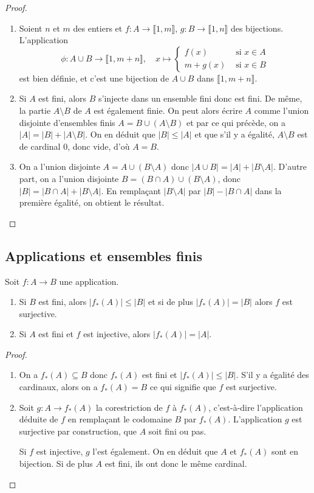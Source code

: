 \begin{proof}
\begin{enumerate}
\item Soient $n$ et $m$ des entiers et $f : A\to \llbracket 1,m\rrbracket$, $g : B\to \llbracket 1,n\rrbracket$ des bijections. L'application 
\[
\phi : A\cup B \to \llbracket 1,m+n\rrbracket, \quad x\mapsto
\begin{cases}
f(x) & \text{ si }x\in A\\
m+g(x) & \text{ si }x\in B
\end{cases}
\]
est bien définie, et c'est une bijection de $A\cup B$ dans $\llbracket 1,m+n\rrbracket$.
\item Si $A$ est fini, alors $B$ s'injecte dans un ensemble fini donc est fini. De même, la partie $A\setminus B$ de $A$ est également finie. On peut alors écrire $A$ comme l'union disjointe d'ensembles finis $A=B \cup (A\setminus B)$ et par ce qui précède, on a $|A|=|B|+|A\setminus B|$. On en déduit que $|B|\leq |A|$ et que s'il y a égalité, $A\setminus B$ est de cardinal $0$, donc vide, d'où $A=B$.
\item On a l'union disjointe $A = A\cup (B\setminus A)$  donc $|A\cup B| = |A|+|B\setminus A|$.
D'autre part, on a l'union disjointe $B = (B\cap A) \cup (B\setminus A)$, donc $|B| = |B\cap A|+|B\setminus A|$.
En remplaçant $|B\setminus A|$ par $|B|-|B\cap A|$ dans la première égalité, on obtient le résultat.
\end{enumerate}
\end{proof}

\subsection{Applications et ensembles finis}

\begin{proposition}
Soit $f : A\to B$ une application.
\begin{enumerate}
\item Si $B$ est fini, alors $|f_*(A)|\leq |B|$ et si de plus $|f_*(A)|= |B|$ alors $f$ est surjective.
\item Si $A$ est fini et $f$ est injective, alors $|f_*(A)|=|A|$.
\end{enumerate}
\end{proposition}
\begin{proof}
\begin{enumerate}
\item On a $f_*(A)\subseteq B$ donc $f_*(A)$ est fini et $|f_*(A)|\leq |B|$. S'il y a égalité des cardinaux, alors on a $f_*(A)=B$ ce qui signifie que $f$ est surjective.
\item Soit $g : A\to f_*(A)$ la corestriction de $f$ à $f_*(A)$, c'est-à-dire l'application déduite de $f$ en remplaçant le codomaine $B$ par $f_*(A)$. L'application $g$ est surjective par construction, que $A$ soit fini ou pas.

Si $f$ est injective, $g$ l'est également. On en déduit que $A$ et $f_*(A)$ sont en bijection. Si de plus $A$ est fini, ils ont donc le même cardinal.
\end{enumerate}
\end{proof}

